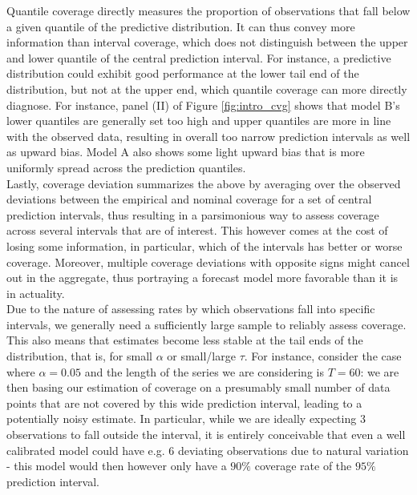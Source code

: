 Quantile coverage directly measures the proportion of observations that fall below a given quantile of the predictive distribution. It can thus convey more information than interval coverage, which does not distinguish between the upper and lower quantile of the central prediction interval. For instance, a predictive distribution could exhibit good performance at the lower tail end of the distribution, but not at the upper end, which quantile coverage can more directly diagnose. For instance, panel (II) of Figure \ref{fig:intro_cvg} shows that model B's lower quantiles are generally set too high and upper quantiles are more in line with the observed data, resulting in overall too narrow prediction intervals as well as upward bias. Model A also shows some light upward bias that is more uniformly spread across the prediction quantiles. \medskip \\
Lastly, coverage deviation summarizes the above by averaging over the observed deviations between the empirical and nominal coverage for a set of central prediction intervals, thus resulting in a parsimonious way to assess coverage across several intervals that are of interest. This however comes at the cost of losing some information, in particular, which of the intervals has better or worse coverage. Moreover, multiple coverage deviations with opposite signs might cancel out in the aggregate, thus portraying a forecast model more favorable than it is in actuality. \medskip\\   
Due to the nature of assessing rates by which observations fall into specific intervals, we generally need a sufficiently large sample to reliably assess coverage. This also means that estimates become less stable at the tail ends of the distribution, that is, for small $\alpha$ or small/large $\tau$. For instance, consider the case where $\alpha = 0.05$ and the length of the series we are considering is $T = 60$: we are then basing our estimation of coverage on a presumably small number of data points that are not covered by this wide prediction interval, leading to a potentially noisy estimate. In particular, while we are ideally expecting 3 observations to fall outside the interval, it is entirely conceivable that even a well calibrated model could have e.g. 6 deviating observations due to natural variation - this model would then however only have a $90\%$ coverage rate of the $95\%$ prediction interval.  \\
